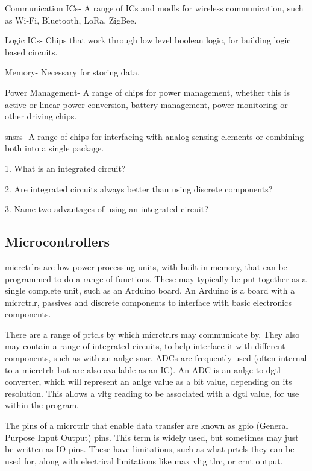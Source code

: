 \documentclass[a4paper,11pt]{report}
\newcommand{\Quiz}[1] %
{
\par\noindent %
\phantomsection %
\todo[inline, color=blue!30]{\textbf{#1}} %
\vspace{1em} %
}
\begin{document}
Communication ICs- A range of ICs and \gls{modl}s for wireless communication, such as Wi-Fi, Bluetooth, LoRa, ZigBee.

Logic ICs- Chips that work through low level boolean logic, for building logic based circuits.

Memory- Necessary for storing data.

Power Management- A range of chips for power management, whether this is active or linear power conversion, battery management, power monitoring or other driving chips.

\gls{snsr}s- A range of chips for interfacing with analog sensing elements or combining both into a single package.

\Quiz{Quiz}

1. What is an integrated circuit?

2. Are integrated circuits always better than using discrete components?

3. Name two advantages of using an integrated circuit?

\vspace*{1\baselineskip}

\subsection{Microcontrollers}

\gls{micrctrlr}s are low power processing units, with built in memory, that can be programmed to do a range of functions. These may typically be put together as a single complete unit, such as an Arduino board. An Arduino is a board with a \gls{micrctrlr}, passives and discrete components to interface with basic electronics components.

There are a range of \gls{prtcl}s by which \gls{micrctrlr}s may communicate by. They also may contain a range of integrated circuits, to help interface it with different components, such as with an \gls{anlge} \gls{snsr}. ADCs are frequently used (often internal to a \gls{micrctrlr} but are also available as an IC). An ADC is an \gls{anlge} to \gls{dgtl} converter, which will represent an \gls{anlge} value as a bit value, depending on its resolution. This allows a \gls{vltg} reading to be associated with a \gls{dgtl} value, for use within the program.

The pins of a \gls{micrctrlr} that enable data transfer are known as \gls{gpio} (General Purpose Input Output) pins. This term is widely used, but sometimes may just be written as IO pins. These have limitations, such as what \gls{prtcl}s they can be used for, along with electrical limitations like max \gls{vltg} \gls{tlrc}, or \gls{crnt} output.
\end{document}

